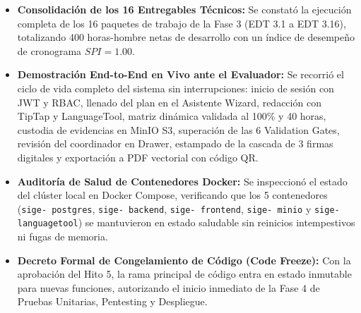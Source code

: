 \documentclass[12pt,a4paper]{article}
\begin{document}
\begin{itemize}[leftmargin=1.5em, itemsep=4pt]
    \item \textbf{Consolidación de los 16 Entregables Técnicos:} Se constató la ejecución completa de los 16 paquetes de trabajo de la Fase 3 (EDT 3.1 a EDT 3.16), totalizando 400 horas-hombre netas de desarrollo con un índice de desempeño de cronograma $SPI = 1.00$.
    \item \textbf{Demostración End-to-End en Vivo ante el Evaluador:} Se recorrió el ciclo de vida completo del sistema sin interrupciones: inicio de sesión con JWT y RBAC, llenado del plan en el Asistente Wizard, redacción con TipTap y LanguageTool, matriz dinámica validada al 100\% y 40 horas, custodia de evidencias en MinIO S3, superación de las 6 Validation Gates, revisión del coordinador en Drawer, estampado de la cascada de 3 firmas digitales y exportación a PDF vectorial con código QR.
    \item \textbf{Auditoría de Salud de Contenedores Docker:} Se inspeccionó el estado del clúster local en Docker Compose, verificando que los 5 contenedores (\texttt{sige- postgres}, \texttt{sige- backend}, \texttt{sige- frontend}, \texttt{sige- minio} y \texttt{sige- languagetool}) se mantuvieron en estado saludable sin reinicios intempestivos ni fugas de memoria.
    \item \textbf{Decreto Formal de Congelamiento de Código (Code Freeze):} Con la aprobación del Hito 5, la rama principal de código entra en estado inmutable para nuevas funciones, autorizando el inicio inmediato de la Fase 4 de Pruebas Unitarias, Pentesting y Despliegue.
\end{itemize}
\end{document}
